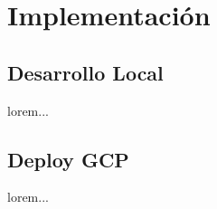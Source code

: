 
\chapter{Implementación}

  \section{Desarrollo Local}

lorem...

  \section{Deploy GCP}

lorem...

